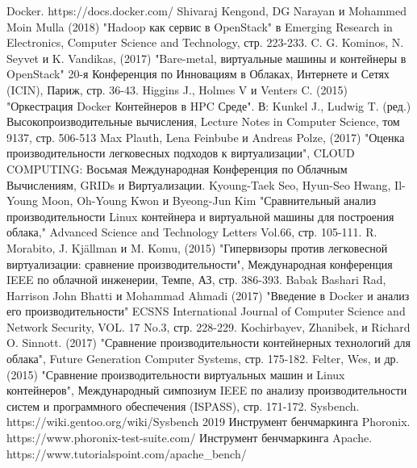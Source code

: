 \documentclass{mirea}
\begin{document}
	\begin{thebibliography}{99\kern\bibindent}
		 Docker. https://docs.docker.com/
		 Shivaraj Kengond, DG Narayan и Mohammed Moin Mulla (2018) "Hadoop как сервис в OpenStack" в Emerging Research in Electronics, Computer Science and Technology, стр. 223-233.
		 C. G. Kominos, N. Seyvet и K. Vandikas, (2017) "Bare-metal, виртуальные машины и контейнеры в OpenStack" 20-я Конференция по Инновациям в Облаках, Интернете и Сетях (ICIN), Париж, стр. 36-43.
		 Higgins J., Holmes V и Venters C. (2015) "Оркестрация Docker Контейнеров в HPC Среде". В: Kunkel J., Ludwig T. (ред.) Высокопроизводительные вычисления, Lecture Notes in Computer Science, том 9137, стр. 506-513
		 Max Plauth, Lena Feinbube и Andreas Polze, (2017) "Оценка производительности легковесных подходов к виртуализации", CLOUD COMPUTING: Восьмая Международная Конференция по Облачным Вычислениям, GRIDs и Виртуализации.
		 Kyoung-Taek Seo, Hyun-Seo Hwang, Il-Young Moon, Oh-Young Kwon и Byeong-Jun Kim "Сравнительный анализ производительности Linux контейнера и виртуальной машины для построения облака," Advanced Science and Technology Letters Vol.66, стр. 105-111.
		 R. Morabito, J. Kjällman и M. Komu, (2015) "Гипервизоры против легковесной виртуализации: сравнение производительности", Международная конференция IEEE по облачной инженерии, Темпе, АЗ, стр. 386-393.
		 Babak Bashari Rad, Harrison John Bhatti и Mohammad Ahmadi (2017) "Введение в Docker и анализ его производительности" ECSNS International Journal of Computer Science and Network Security, VOL. 17 No.3, стр. 228-229.
		 Kochirbayev, Zhanibek, и Richard O. Sinnott. (2017) "Сравнение производительности контейнерных технологий для облака", Future Generation Computer Systems, стр. 175-182.
		 Felter, Wes, и др. (2015) "Сравнение производительности виртуальных машин и Linux контейнеров", Международный симпозиум IEEE по анализу производительности систем и программного обеспечения (ISPASS), стр. 171-172.
		 Sysbench. https://wiki.gentoo.org/wiki/Sysbench 2019
		 Инструмент бенчмаркинга Phoronix. https://www.phoronix-test-suite.com/
		 Инструмент бенчмаркинга Apache. https://www.tutorialspoint.com/apache\_bench/
	\end{thebibliography}

	
	
	
	
	
	
	
\end{document}
